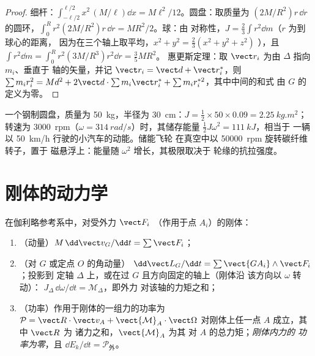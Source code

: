 \begin{proof}
细杆：$\int_{-\ell/2}^{\ell/2}x^2\,(M/\ell)\dd x = \allowbreak M\ell^2/12$。圆盘：取质量为
$(2M/R^2)r\,\dd r$ 的圆环，$\int_0^R r^2\allowbreak(2M/R^2)r\,\dd r = \allowbreak MR^2/2$。球：由
对称性，$J = \tfrac23\int r^2\dd m$（$r$ 为到球心的距离，
因为在三个轴上取平均，$x^2 + y^2 = \tfrac23(x^2 + y^2 + z^2)$
），且 $\int r^2\dd m = \int_0^R r^2(3M/R^3)r^2\dd r = \tfrac35MR^2$。
惠更斯定理：取 $\vect r_i$ 为由 $\Delta$ 指向 $m_i$、垂直于
轴的矢量，并记 $\vect r_i = \vect d + \vect r_i^*$，则 $\sum m_ir_i^2 = Md^2
+ 2\vect d\cdot\sum m_i\vect r_i^* + \sum m_ir_i^{*2}$，其中中间的和式
由 $G$ 的定义为零。
\end{proof}

\begin{example}[飞轮]\label{ex:b2:rigid-body-mechanics:flywheel}
一个钢制圆盘，质量为 \qty{50}{kg}，半径为 \qty{30}{cm}：$J = \tfrac12 \times
50 \times 0.09 = \qty{2.25}{kg.m^2}$；转速为 \qty{3000}{rpm}（$\omega =
\qty{314}{rad/s}$）时，其储存能量 $\tfrac12J\omega^2 = \qty{111}{kJ}$，相当于
一辆以 \qty{50}{km/h} 行驶的小汽车的动能。储能飞轮
在真空中以 \qty{50000}{rpm} 旋转碳纤维转子，置于
磁悬浮上：能量随 $\omega^2$ 增长，其极限取决于
轮缘的抗拉强度。
\end{example}

\section{刚体的动力学}

\begin{theorem}[刚体的运动定律]\label{thm:b2:rigid-body-mechanics:laws}
在伽利略参考系中，对受外力 $\vect F_i$
（作用于点 $A_i$）的刚体：
\begin{enumerate}
  \item （动量）$M\,\dd\vect v_G/\dd t = \sum\vect F_i$；
  \item （对 $G$ 或定点 $O$ 的角动量）
        $\dd\vect L_G/\dd t = \sum\vect{GA_i}\wedge\vect F_i$；投影到
        定轴 $\Delta$ 上，或在过 $G$ 且方向固定的轴上（刚体沿
        该方向以 $\omega$ 转动）：
        $J_\Delta\,\dd\omega/\dd t = \mathcal M_\Delta$，即外力
        对该轴的力矩之和；
  \item （功率）作用于刚体的一组力的功率为
        $\mathcal P = \vect R\cdot\vect v_A + \vect{\mathcal M}_A\cdot
        \vect\Omega$ 对刚体上任一点 $A$ 成立，其中 $\vect R$ 为
        诸力之和，$\vect{\mathcal M}_A$ 为其
        对 $A$ 的总力矩；\emph{刚体内力的
        功率为零}，且 $\dd E_k/\dd t = \mathcal P_{\text{外}}$。
\end{enumerate}
\end{theorem}

